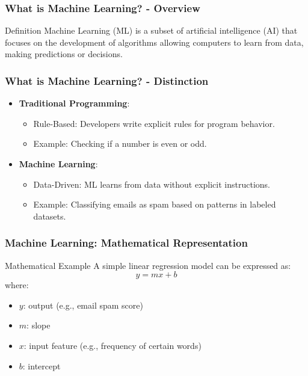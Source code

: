 \documentclass[aspectratio=169]{beamer}
\begin{document}
\begin{frame}[fragile]
    \frametitle{What is Machine Learning? - Overview}
    \begin{block}{Definition}
        Machine Learning (ML) is a subset of artificial intelligence (AI) that focuses on the development of algorithms allowing computers to learn from data, making predictions or decisions.
    \end{block}
\end{frame}

\begin{frame}[fragile]
    \frametitle{What is Machine Learning? - Distinction}
    \begin{itemize}
        \item \textbf{Traditional Programming}:
        \begin{itemize}
            \item Rule-Based: Developers write explicit rules for program behavior.
            \item Example: Checking if a number is even or odd.
        \end{itemize}
        \item \textbf{Machine Learning}:
        \begin{itemize}
            \item Data-Driven: ML learns from data without explicit instructions.
            \item Example: Classifying emails as spam based on patterns in labeled datasets.
        \end{itemize}
    \end{itemize}
\end{frame}

\begin{frame}[fragile]
    \frametitle{Machine Learning: Mathematical Representation}
    \begin{block}{Mathematical Example}
        A simple linear regression model can be expressed as:
        \begin{equation}
            y = mx + b
        \end{equation}
        where:
        \begin{itemize}
            \item \(y\): output (e.g., email spam score)
            \item \(m\): slope
            \item \(x\): input feature (e.g., frequency of certain words)
            \item \(b\): intercept
        \end{itemize}
    \end{block}
\end{frame}
\end{document}
